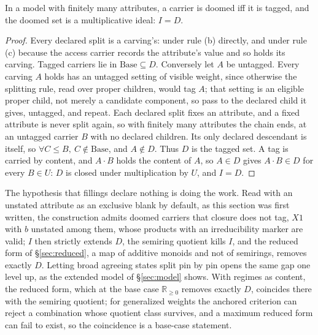 \begin{prop}\label{prop:doom-tag}
In a model with finitely many attributes, a carrier is doomed iff it is tagged, and the doomed set is a multiplicative ideal: $I = D$.
\end{prop}

\begin{proof}
Every declared split is a carving's: under rule (b) directly, and under rule (c) because the access carrier records the attribute's value and so holds its carving. Tagged carriers lie in $\mathrm{Base} \subseteq D$. Conversely let $A$ be untagged. Every carving $A$ holds has an untagged setting of visible weight, since otherwise the splitting rule, read over proper children, would tag $A$; that setting is an eligible proper child, not merely a candidate component, so pass to the declared child it gives, untagged, and repeat.  Each declared split fixes an attribute, and a fixed attribute is never split again, so with finitely many attributes the chain ends, at an untagged carrier $B$ with no declared children. Its only declared descendant is itself, so $\forall C \le B,\ C \notin \mathrm{Base}$, and $A \notin D$. Thus $D$ is the tagged set. A tag is carried by content, and $A \cdot B$ holds the content of $A$, so $A \in D$ gives $A \cdot B \in D$ for every $B \in U$: $D$ is closed under multiplication by $U$, and $I = D$.
\end{proof}

\noindent The hypothesis that fillings declare nothing is doing the work. Read with an unstated attribute as an exclusive blank by default, as this section was first written, the construction admits doomed carriers that closure does not tag, $X1$ with $b$ unstated among them, whose products with an irreducibility marker are valid; $I$ then strictly extends $D$, the semiring quotient kills $I$, and the reduced form of §\ref{sec:reduced}, a map of additive monoids and not of semirings, removes exactly $D$. Letting broad agreeing states split pin by pin opens the same gap one level up, as the extended model of §\ref{sec:model} shows. With regimes as content, the reduced form, which at the base case $\mathbb{R}_{\ge 0}$ removes exactly $D$, coincides there with the semiring quotient; for generalized weights the anchored criterion can reject a combination whose quotient class survives, and a maximum reduced form can fail to exist, so the coincidence is a base-case statement.

